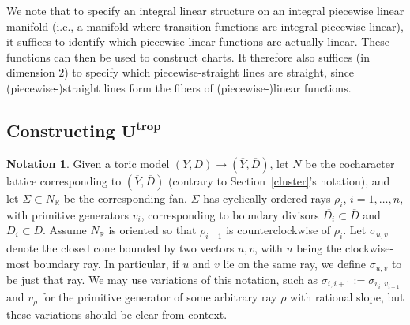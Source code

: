 \documentclass[pdftex]{sigma}
\numberwithin{equation}{section}
\numberwithin{figure}{section}
\numberwithin{table}{section}
\DeclareMathOperator{\trop}{trop}
\let\?=\overline
\let\bb=\mathbb
\let\rar=\rightarrow
\theoremstyle{definition}
\newtheorem{ntn}[thm]{Notation}
\begin{document}
We note that to specify an integral linear structure on an integral piecewise linear manifold (i.e., a manifold where transition functions are integral piecewise linear), it suffices to identify which piecewise linear functions are actually linear. These functions can then be used to construct charts. It therefore also suffices (in dimension $2$) to specify which piecewise-straight lines are straight, since (piecewise-)straight lines form the fibers of (piecewise-)linear functions.

\subsection[Constructing $U^{\trop}$]{Constructing $\boldsymbol{U^{\trop}}$} \label{Ut}

\begin{ntn}\label{UtropNotation} Given a toric model $(Y,D) \rar (\?{Y},\?{D})$, let $N$ be the cocharacter lattice corresponding to $(\?{Y},\?{D})$ (contrary to Section~\ref{cluster}'s notation), and let $\Sigma\subset N_{\bb{R}}$ be the corresponding fan. $\Sigma$ has cyclically ordered rays $\rho_i$, $i=1,\dots,n$, with primitive generators $v_i$, corresponding to boundary divisors $\?{D_i}\subset \?{D}$ and $D_i \subset D$. Assume $N_{\bb{R}}$ is oriented so that $\rho_{i+1}$ is counterclockwise of $\rho_i$. Let $\sigma_{u,v}$ denote the closed cone bounded by two vectors $u,v$, with $u$ being the clockwise-most boundary ray. In particular, if $u$ and $v$ lie on the same ray, we define $\sigma_{u,v}$ to be just that ray. We may use variations of this notation, such as $\sigma_{i,i+1}:=\sigma_{v_i,v_{i+1}}$ and $v_{\rho}$ for the primitive generator of some arbitrary ray $\rho$ with rational slope, but these variations should be clear from context.
\end{ntn}
\end{document}
